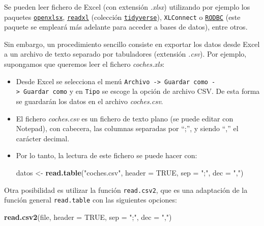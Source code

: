 \documentclass[]{book}
\newenvironment{Shaded}{\begin{snugshade}}{\end{snugshade}}
\newcommand{\DataTypeTok}[1]{\textcolor[rgb]{0.13,0.29,0.53}{#1}}
\newcommand{\KeywordTok}[1]{\textcolor[rgb]{0.13,0.29,0.53}{\textbf{#1}}}
\newcommand{\NormalTok}[1]{#1}
\newcommand{\OtherTok}[1]{\textcolor[rgb]{0.56,0.35,0.01}{#1}}
\newcommand{\StringTok}[1]{\textcolor[rgb]{0.31,0.60,0.02}{#1}}
\begin{document}
Se pueden leer fichero de
Excel (con extensión \emph{.xlsx}) utilizando por ejemplo los paquetes \href{https://cran.r-project.org/web/packages/openxlsx/index.html}{\texttt{openxlsx}}, \href{https://readxl.tidyverse.org}{\texttt{readxl}} (colección \href{https://www.tidyverse.org/}{\texttt{tidyverse}}), \texttt{XLConnect} o
\href{https://cran.r-project.org/web/packages/RODBC/index.html}{\texttt{RODBC}} (este paquete se empleará más adelante para acceder a bases de datos),
entre otros.

Sin embargo, un procedimiento sencillo consiste en exportar los datos desde Excel a un archivo
de texto separado por tabuladores (extensión \emph{.csv}).
Por ejemplo, supongamos que queremos leer el fichero \emph{coches.xls}:

\begin{itemize}
\item
  Desde Excel se selecciona el menú
  \texttt{Archivo\ -\textgreater{}\ Guardar\ como\ -\textgreater{}\ Guardar\ como} y en \texttt{Tipo} se escoge la opción de
  archivo CSV. De esta forma se guardarán los datos en el archivo
  \emph{coches.csv}.
\item
  El fichero \emph{coches.csv} es un fichero de texto plano (se puede
  editar con Notepad), con cabecera, las columnas separadas por ``;'', y
  siendo ``,'' el carácter decimal.
\item
  Por lo tanto, la lectura de este fichero se puede hacer con:

\begin{Shaded}
\begin{Highlighting}[]
\NormalTok{datos <-}\StringTok{ }\KeywordTok{read.table}\NormalTok{(}\StringTok{"coches.csv"}\NormalTok{, }\DataTypeTok{header =} \OtherTok{TRUE}\NormalTok{, }\DataTypeTok{sep =} \StringTok{";"}\NormalTok{, }\DataTypeTok{dec =} \StringTok{","}\NormalTok{)}
\end{Highlighting}
\end{Shaded}
\end{itemize}

Otra posibilidad es utilizar la función \texttt{read.csv2}, que es
una adaptación de la función general \texttt{read.table} con las siguientes
opciones:

\begin{Shaded}
\begin{Highlighting}[]
\KeywordTok{read.csv2}\NormalTok{(file, }\DataTypeTok{header =} \OtherTok{TRUE}\NormalTok{, }\DataTypeTok{sep =} \StringTok{";"}\NormalTok{, }\DataTypeTok{dec =} \StringTok{","}\NormalTok{)}
\end{Highlighting}
\end{Shaded}
\end{document}
